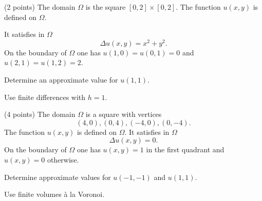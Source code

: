 \begin{teilaufgaben}
\item (2 points)
The domain $\Omega$ is the square $[0,2] \times [0, 2]$.
The function $u(x,y)$ is defined on $\Omega$. 

\vspace{2mm}

It satisfies in $\Omega$ 
\[
\Delta u(x,y) = x^2 + y^2.
\]
On the boundary of $\Omega$ one has $u(1,0) = u(0,1) = 0$ and
$u(2,1) = u(1,2) = 2$. 

\vspace{2mm}

Determine an approximate value for $u(1,1)$. 

\vspace{2mm}

Use finite differences with $h = 1$.

\vspace{8mm}

\item (4 points)
The domain $\Omega$ is a square with vertices
\[
(4,0), (0,4), (-4, 0), (0,-4).
\]
The function $u(x,y)$ is defined on $\Omega$.
It satisfies in $\Omega$ 
\[
\Delta u(x,y) = 0.
\]
On the boundary of $\Omega$ one has $u(x,y) = 1$ in the first quadrant
and $u(x,y) = 0$ otherwise.

\vspace{2mm}

Determine approximate values for $u(-1,-1)$ and $u(1,1)$.

\vspace{2mm}

Use finite volumes \`a la Voronoi.  
\end{teilaufgaben}


